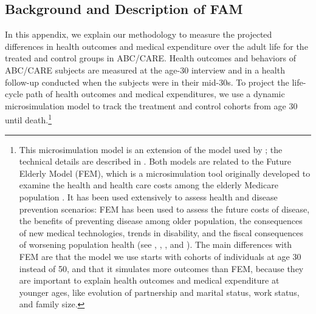 \subsection{Background and Description of FAM}

\noindent In this appendix, we explain our methodology to measure the projected differences in health outcomes and medical expenditure over the adult life for the treated and control groups in ABC/CARE.
Health outcomes and behaviors of ABC/CARE subjects are measured at the age-30 interview and in a health follow-up conducted when the subjects were in their mid-30s.
To project the life-cycle path of health outcomes and medical expenditures, we use a dynamic microsimulation model to track the treatment and control cohorts from age 30 until death.\footnote{This microsimulation model is an extension of the model used by \citet{Prados_etal_2015_How-Much-Can-Education}; the technical details are described in \citet{Goldman_etal_2015_Future-America-Model}. Both models are related to the Future Elderly Model (FEM), which is a microsimulation tool originally developed to examine the health and health care costs among the elderly Medicare population \citep{Goldman_etal_2004_RAND-Report_Health-Status-Elderly}. It has been used extensively to assess health and disease prevention scenarios: FEM has been used to assess the future costs of disease, the benefits of preventing disease among older population, the consequences of new medical technologies, trends in disability, and the fiscal consequences of worsening population health (see \citet{Goldman_etal_2004_RAND-Report_Health-Status-Elderly}, \citet{Lakdawalla_etal_2004_Health-and-Cost}, \citet{Goldman_etal_2005_HA}, and \citet{Zissimopoulos_etal_2014_Delaying-Alzheimers}). The main differences with FEM are that the model we use starts with cohorts of individuals at age 30 instead of 50, and that it simulates more outcomes than FEM, because they are important to explain health outcomes and medical expenditure at younger ages, like evolution of partnership and marital status, work status, and family size.} 

